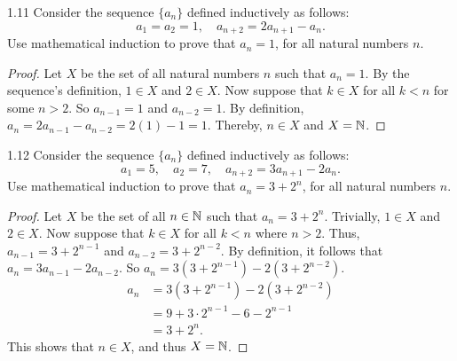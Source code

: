 \begin{exercise}{1.11}
    Consider the sequence \(\{a_n\}\) defined inductively as follows:
    \[a_1 = a_2 = 1, \quad a_{n+2} = 2a_{n+1} - a_n.\]
    Use mathematical induction to prove that \(a_n = 1\), for all natural numbers \(n\).
\end{exercise}
\begin{proof}
    Let \(X\) be the set of all natural numbers \(n\) such that \(a_n = 1\). By the sequence's definition,
    \(1 \in X\) and \(2 \in X\). Now suppose that \(k \in X\) for all \(k < n\) for some \(n > 2\). So \(a_{n-1} = 1\) and \(a_{n-2} = 1\).
    By definition, \(a_n = 2a_{n-1} - a_{n-2} = 2(1) - 1 = 1\). Thereby, \(n \in X\) and \(X = \mathbb{N}\).
\end{proof}

\begin{exercise}{1.12}
    Consider the sequence \(\{a_n\}\) defined inductively as follows:
    \[a_1 = 5, \quad a_2 = 7, \quad a_{n+2} = 3a_{n+1} - 2a_n.\]
    Use mathematical induction to prove that \(a_n = 3 + 2^n\), for all natural numbers \(n\).
\end{exercise}
\begin{proof}
    Let \(X\) be the set of all \(n \in \mathbb{N}\) such that \(a_n = 3 + 2^n\). Trivially, \(1 \in X\) and \(2 \in X\).
    Now suppose that \(k \in X\) for all \(k < n\) where \(n > 2\). Thus, \(a_{n-1} = 3 + 2^{n-1}\) and \(a_{n-2} = 3 + 2^{n-2}\).
    By definition, it follows that \(a_n = 3a_{n-1} - 2a_{n-2}\). So \(a_n = 3(3 + 2^{n-1}) - 2(3 + 2^{n-2})\).
    \begin{align*}
        a_n &= 3(3 + 2^{n-1}) - 2(3 + 2^{n-2}) \\
        &= 9 + 3\cdot 2^{n-1} - 6 - 2^{n-1} \\
        &= 3 + 2^n.
    \end{align*}
    This shows that \(n \in X\), and thus \(X = \mathbb{N}\).
\end{proof}

